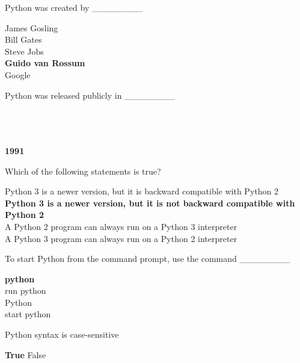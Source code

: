 \documentclass{exam}
\begin{document}
\begin{questions}
    \question Python was created by \_\_\_\_\_\_\_\_
    
    \begin{oneparchoices}
        \choice James Gosling \\
        \choice Bill Gates \\
        \choice Steve Jobs \\
        \choice \textbf{Guido van Rossum} \\
        \choice Google 
    \end{oneparchoices}

    \question Python was released publicly in \_\_\_\_\_\_\_\_

    \begin{oneparchoices}
         \\
         \\ 
         \\
        \choice \textbf{1991}
    \end{oneparchoices}

    \question Which of the following statements is true?

    \begin{oneparchoices}
        \choice Python 3 is a newer version, but it is backward compatible with Python 2 \\
        \choice \textbf{Python 3 is a newer version, but it is not backward compatible with Python 2} \\
        \choice A Python 2 program can always run on a Python 3 interpreter\\
        \choice A Python 3 program can always run on a Python 2 interpreter
    \end{oneparchoices}

    \question To start Python from the command prompt, use the command \_\_\_\_\_\_\_\_ 

    \begin{oneparchoices}
        \choice \textbf{python} \\
        \choice run python \\
        \choice Python \\
        \choice start python
    \end{oneparchoices}

    \question Python syntax is case-sensitive

    \begin{oneparchoices}
        \choice \textbf{True}
        \choice False
    \end{oneparchoices}


\end{questions}
\end{document}
